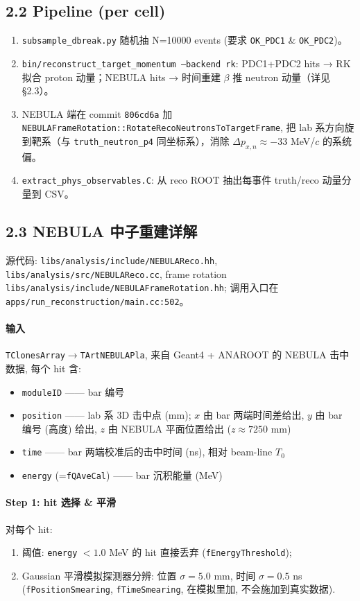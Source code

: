 \documentclass[a4paper,11pt]{article}
\begin{document}
\subsection*{2.2 Pipeline (per cell)}
\begin{enumerate}[nosep]
\item \texttt{subsample\_dbreak.py} 随机抽 N=10000 events (要求 \texttt{OK\_PDC1} \& \texttt{OK\_PDC2})。
\item \texttt{bin/reconstruct\_target\_momentum --backend rk}: PDC1+PDC2 hits → RK 拟合 proton 动量；NEBULA hits → 时间重建 $\beta$ 推 neutron 动量（详见 §2.3）。
\item NEBULA 端在 commit \texttt{806cd6a} 加 \texttt{NEBULAFrameRotation::RotateRecoNeutronsToTargetFrame}, 把 lab 系方向旋到靶系（与 \texttt{truth\_neutron\_p4} 同坐标系），消除 $\Delta p_{x,n} \approx -33$ MeV/$c$ 的系统偏。
\item \texttt{extract\_phys\_observables.C}: 从 reco ROOT 抽出每事件 truth/reco 动量分量到 CSV。
\end{enumerate}

\subsection*{2.3 NEBULA 中子重建详解}

源代码: \texttt{libs/analysis/include/NEBULAReco.hh}, \texttt{libs/analysis/src/NEBULAReco.cc}, frame rotation \texttt{libs/analysis/include/NEBULAFrameRotation.hh}; 调用入口在 \texttt{apps/run\_reconstruction/main.cc:502}。

\paragraph{输入} \texttt{TClonesArray$\to$TArtNEBULAPla}, 来自 Geant4 + ANAROOT 的 NEBULA 击中数据, 每个 hit 含:
\begin{itemize}[nosep]
\item \texttt{moduleID} —— bar 编号
\item \texttt{position} —— lab 系 3D 击中点 (mm); $x$ 由 bar 两端时间差给出, $y$ 由 bar 编号 (高度) 给出, $z$ 由 NEBULA 平面位置给出 ($z\approx 7250$ mm)
\item \texttt{time} —— bar 两端校准后的击中时间 (ns), 相对 beam-line $T_0$
\item \texttt{energy} (=\texttt{fQAveCal}) —— bar 沉积能量 (MeV)
\end{itemize}

\paragraph{Step 1: hit 选择 \& 平滑}
对每个 hit:
\begin{enumerate}[nosep]
\item 阈值: \texttt{energy} $< 1.0$ MeV 的 hit 直接丢弃 (\texttt{fEnergyThreshold});
\item Gaussian 平滑模拟探测器分辨: 位置 $\sigma = 5.0$ mm, 时间 $\sigma = 0.5$ ns (\texttt{fPositionSmearing}, \texttt{fTimeSmearing}, 在模拟里加, 不会施加到真实数据).
\end{enumerate}
\end{document}
